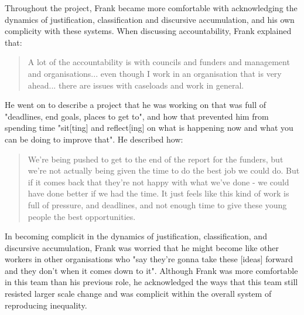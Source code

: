 Throughout the project, Frank became more comfortable with acknowledging the dynamics of justification, classification and discursive accumulation, and his own complicity with these systems. When discussing accountability, Frank explained that:
\begin{quote}
A lot of the accountability is with councils and funders and management and organisations... even though I work in an organisation that is very ahead... there are issues with caseloads and work in general.
\end{quote}
He went on to describe a project that he was working on that was full of "deadlines, end goals, places to get to", and how that prevented him from spending time "sit[ting] and reflect[ing] on what is happening now and what you can be doing to improve that". He described how:
\begin{quote}
We're being pushed to get to the end of the report for the funders, but we're not actually being given the time to do the best job we could do. But if it comes back that they're not happy with what we've done - we could have done better if we had the time. It just feels like this kind of work is full of pressure, and deadlines, and not enough time to give these young people the best opportunities.
\end{quote}
In becoming complicit in the dynamics of justification, classification, and discursive accumulation, Frank was worried that he might become like other workers in other organisations who "say they're gonna take these [ideas] forward and they don't when it comes down to it". Although Frank was more comfortable in this team than his previous role, he acknowledged the ways that this team still resisted larger scale change and was complicit within the overall system of reproducing inequality. 

